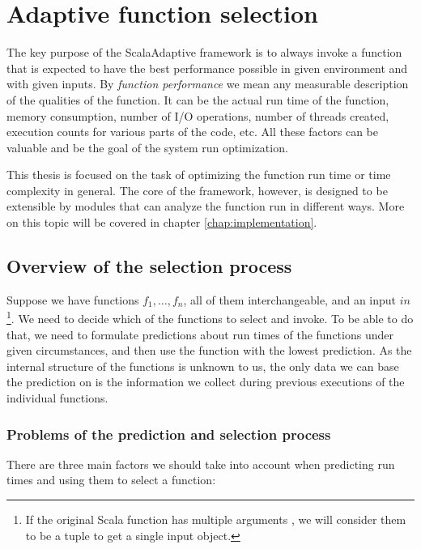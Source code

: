 \chapter{Adaptive function selection}
\label{chap:deciding}

The key purpose of the ScalaAdaptive framework is to always invoke a function that is expected to have the best performance possible in given environment and with given inputs. By \textit{function performance} we mean any measurable description of the qualities of the function. It can be the actual run time of the function, memory consumption, number of I/O operations, number of threads created, execution counts for various parts of the code, etc. All these factors can be valuable and be the goal of the system run optimization.

This thesis is focused on the task of optimizing the function run time or time complexity in general. The core of the framework, however, is designed to be extensible by modules that can analyze the function run in different ways. More on this topic will be covered in chapter \ref{chap:implementation}.

\section{Overview of the selection process}
\label{sec:selection_overview}

Suppose we have functions $f_1,\dots, f_n$, all of them interchangeable, and an input $in$\footnote{If the original Scala function has multiple arguments , we will consider them to be a tuple  to get a single input object.}. We need to decide which of the functions to select and invoke. To be able to do that, we need to formulate predictions about run times of the functions under given circumstances, and then use the function with the lowest prediction. As the internal structure of the functions is unknown to us, the only data we can base the prediction on is the information we collect during previous executions of the individual functions.

\subsection{Problems of the prediction and selection process}

There are three main factors we should take into account when predicting run times and using them to select a function:

